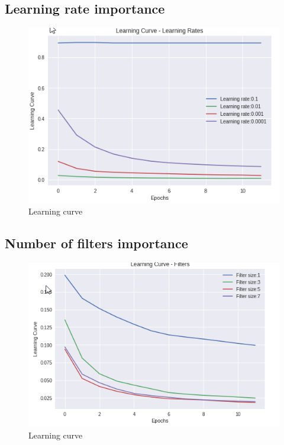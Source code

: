 \documentclass{scrartcl}
\begin{document}
\subsection*{Learning rate importance}

\begin{figure}[H]
	\centering
	\includegraphics[scale=0.6]{2}
	\caption{Learning curve}
	\label{fig:2}
\end{figure}


\subsection*{Number of filters importance}

\begin{figure}[H]
	\centering
	\includegraphics[scale=0.6]{3}
	\caption{Learning curve}
	\label{fig:3}
\end{figure}
\end{document}

